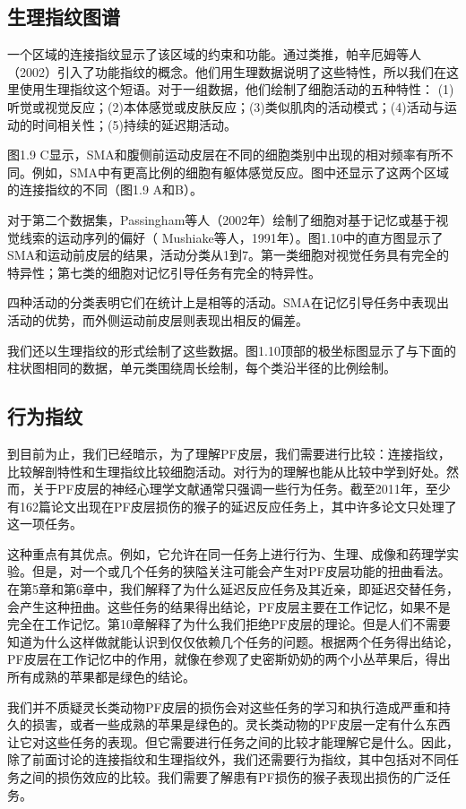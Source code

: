 \subsection{生理指纹图谱}
一个区域的连接指纹显示了该区域的约束和功能。通过类推，帕辛厄姆等人（2002）引入了功能指纹的概念。他们用生理数据说明了这些特性，所以我们在这里使用生理指纹这个短语。对于一组数据，他们绘制了细胞活动的五种特性： (1)听觉或视觉反应；(2)本体感觉或皮肤反应；(3)类似肌肉的活动模式；(4)活动与运动的时间相关性；(5)持续的延迟期活动。
\par
图1.9 C显示，SMA和腹侧前运动皮层在不同的细胞类别中出现的相对频率有所不同。例如，SMA中有更高比例的细胞有躯体感觉反应。图中还显示了这两个区域的连接指纹的不同（图1.9 A和B）。
\par
对于第二个数据集，Passingham等人（2002年）绘制了细胞对基于记忆或基于视觉线索的运动序列的偏好（ Mushiake等人，1991年）。图1.10中的直方图显示了SMA和运动前皮层的结果，活动分类从1到7。第一类细胞对视觉任务具有完全的特异性；第七类的细胞对记忆引导任务有完全的特异性。
\par
四种活动的分类表明它们在统计上是相等的活动。SMA在记忆引导任务中表现出活动的优势，而外侧运动前皮层则表现出相反的偏差。
\par
我们还以生理指纹的形式绘制了这些数据。图1.10顶部的极坐标图显示了与下面的柱状图相同的数据，单元类围绕周长绘制，每个类沿半径的比例绘制。


\subsection{行为指纹}
到目前为止，我们已经暗示，为了理解PF皮层，我们需要进行比较：连接指纹，比较解剖特性和生理指纹比较细胞活动。对行为的理解也能从比较中学到好处。然而，关于PF皮层的神经心理学文献通常只强调一些行为任务。截至2011年，至少有162篇论文出现在PF皮层损伤的猴子的延迟反应任务上，其中许多论文只处理了这一项任务。
\par
这种重点有其优点。例如，它允许在同一任务上进行行为、生理、成像和药理学实验。但是，对一个或几个任务的狭隘关注可能会产生对PF皮层功能的扭曲看法。在第5章和第6章中，我们解释了为什么延迟反应任务及其近亲，即延迟交替任务，会产生这种扭曲。这些任务的结果得出结论，PF皮层主要在工作记忆，如果不是完全在工作记忆。第10章解释了为什么我们拒绝PF皮层的理论。但是人们不需要知道为什么这样做就能认识到仅仅依赖几个任务的问题。根据两个任务得出结论，PF皮层在工作记忆中的作用，就像在参观了史密斯奶奶的两个小丛苹果后，得出所有成熟的苹果都是绿色的结论。
\par
我们并不质疑灵长类动物PF皮层的损伤会对这些任务的学习和执行造成严重和持久的损害，或者一些成熟的苹果是绿色的。灵长类动物的PF皮层一定有什么东西让它对这些任务的表现。但它需要进行任务之间的比较才能理解它是什么。因此，除了前面讨论的连接指纹和生理指纹外，我们还需要行为指纹，其中包括对不同任务之间的损伤效应的比较。我们需要了解患有PF损伤的猴子表现出损伤的广泛任务。


